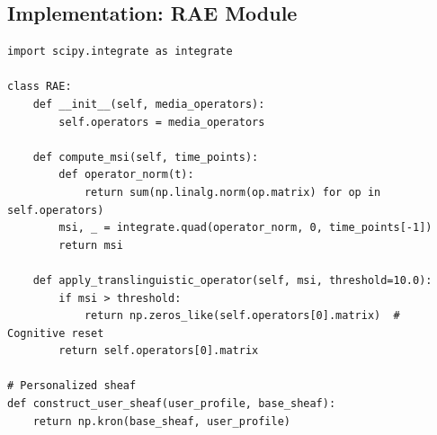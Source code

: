 \documentclass[12pt]{article}
\begin{document}
\subsection{Implementation: RAE Module}
\begin{verbatim}
import scipy.integrate as integrate

class RAE:
    def __init__(self, media_operators):
        self.operators = media_operators
    
    def compute_msi(self, time_points):
        def operator_norm(t):
            return sum(np.linalg.norm(op.matrix) for op in self.operators)
        msi, _ = integrate.quad(operator_norm, 0, time_points[-1])
        return msi
    
    def apply_translinguistic_operator(self, msi, threshold=10.0):
        if msi > threshold:
            return np.zeros_like(self.operators[0].matrix)  # Cognitive reset
        return self.operators[0].matrix

# Personalized sheaf
def construct_user_sheaf(user_profile, base_sheaf):
    return np.kron(base_sheaf, user_profile)
\end{verbatim}


\nocite{*}


\end{document}
